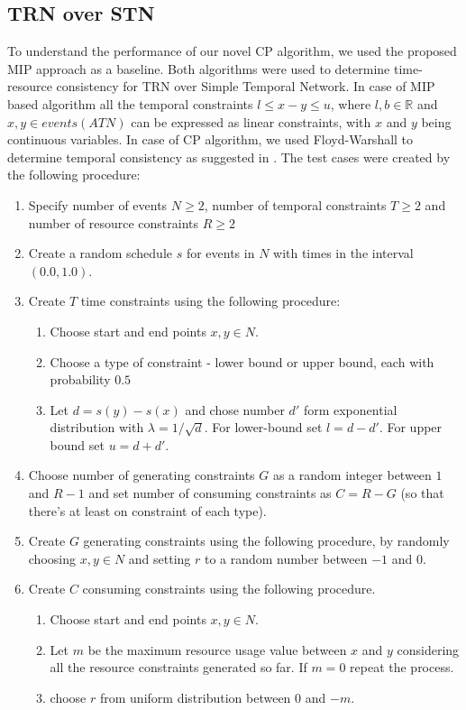 \subsection{TRN over STN}
To understand the performance of our novel CP algorithm, we used the proposed MIP approach as a baseline. Both algorithms were used to determine time-resource consistency for TRN over Simple Temporal Network. In case of MIP based algorithm all the temporal constraints $l \leq x - y \leq u$, where $l,b \in \mathbb{R}$ and $x,y \in events(ATN)$ can be expressed as linear constraints, with $x$ and $y$ being continuous variables. In case of CP algorithm, we used Floyd-Warshall to determine temporal consistency as suggested in \cite{dechter1991temporal}. The test cases were created by the following procedure:
\begin{enumerate}
\setlength\itemsep{0.1em}

\item Specify number of events $N \geq 2$, number of temporal constraints $T\geq 2$ and number of resource constraints $R\geq 2$
\item Create a random schedule $s$ for events in $N$ with times in the interval $(0.0, 1.0)$.
\item Create $T$ time constraints using the following procedure:
  \begin{enumerate}
  \item Choose start and end points $x,y \in N$.
  \item Choose a type of constraint - lower bound or upper bound, each with probability $0.5$
  \item Let $d=s(y) - s(x)$ and chose number $d'$ form exponential distribution with $\lambda = 1 / \sqrt{d}$. For lower-bound set $l = d - d'$. For upper bound set $u = d + d'$.
  \end{enumerate}
\item Choose number of generating constraints $G$ as a random integer between $1$ and $R-1$ and set number of consuming constraints as $C = R - G$ (so that there's at least on constraint of each type).
\item Create $G$ generating constraints using the following procedure, by randomly choosing $x,y \in N$ and setting $r$ to a random number between $-1$ and $0$.
\item Create $C$ consuming constraints using the following procedure.
  \begin{enumerate}
  \item Choose start and end points $x,y \in N$.
  \item Let $m$ be the maximum resource usage value between $x$ and $y$ considering all the resource constraints generated so far. If $m = 0$ repeat the process.
  \item choose $r$ from uniform distribution between $0$ and $-m$.
  \end{enumerate}
\end{enumerate}


